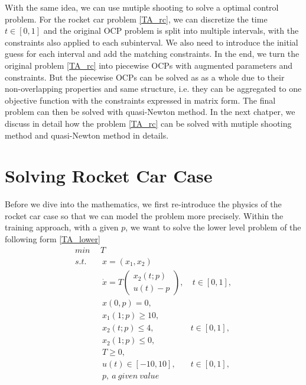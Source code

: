 \documentclass  [
  paper    = a4,
  BCOR     = 10mm,
  twoside,
  fontsize = 12pt,
  fleqn,
  toc      = bibnumbered,
  toc      = listofnumbered,
  numbers  = noendperiod,
  headings = normal,
  listof   = leveldown,
  version  = 3.03
]                                       {scrreprt}
\newcommand{\<}{\langle}
\renewcommand{\>}{\rangle}
\begin{document}
   
   With the same idea, we can use mutiple shooting to solve a optimal control problem. For the rocket car problem \ref{TA_rc}, we can discretize the time $t \in [0, 1]$ and the original OCP problem is split into multiple intervals, with the constraints also applied to each subinterval. We also need to introduce the initial guess for each interval and add the matching constraints. In the end, we turn the original problem  \ref{TA_rc} into piecewise OCPs with augmented parameters and constraints. But the piecewise OCPs can be solved as as a whole due to their non-overlapping properties and same structure, i.e. they can be aggregated to one objective function with the constraints expressed in matrix form. The final problem can then be solved with quasi-Newton method. In the next chatper, we discuss in detail how the problem \ref{TA_rc} can be solved with mutiple shooting method and quasi-Newton method in details. 
   
   
   \chapter{Solving Rocket Car Case}
   Before we dive into the mathematics, we first re-introduce the physics of the rocket car case so that we can model the problem more precisely. Within the training approach, with a given $p$, we want to solve the lower level problem of the following form \ref{TA_lower}
   \begin{subequations}
   	\begin{align}
   	\underset{}{min} \   & \  T \\ 
   	s.t.  & \ \ x = (x_1, x_2)   \label{ta_rc_x} \\ 
   	& \ \  \dot{x} = T  \begin{pmatrix}  x_2(t;p) \\ u(t)-p   \end{pmatrix}, & \ t \in [0,1],  \label{ta_rc_partial2} \\
   	& \ \ x(0,p) = 0, \label{ta_rc_t2}\\
   	& \ \ x_1(1;p) \geq 10, \label{ta_rc_x1_t2} \\
   	& \ \ x_2(t;p) \leq 4, & t \in [0,1], \label{ta_rc_x2_tc2} \\
   	& \ \ x_2(1;p) \leq 0, \label{ta_rc_x2_t1_2}  \\
   	& \ \ T \geq 0, \\
   	& \ \ u(t) \in [-10, 10], & t \in [0,1], \\
   	& \ \ p, \   a \ given \ value
   	\end{align}
   	\label{TA_lower2}
   \end{subequations}
   
\end{document}
